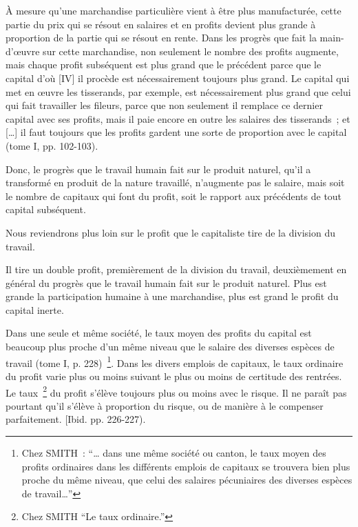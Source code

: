 \documentclass[french,twoside]{book} %
\newenvironment{quoteblock}%
  {\begin{quoting}}
  {\end{quoting}}
\newenvironment{quotebar}{%
    \def\FrameCommand{{\color{rubric!10!}\vrule width 0.5em} \hspace{0.9em}}%
    \def\OuterFrameSep{\itemsep} %
    \MakeFramed {\advance\hsize-\width \FrameRestore}
  }%
  {%
    \endMakeFramed
  }
\renewenvironment{quoteblock}%
  {%
    \savenotes
    \setstretch{0.9}
    \normalfont
    \begin{quotebar}
  }
  {%
    \end{quotebar}
    \spewnotes
  }
\begin{document}
\begin{quoteblock}
 À mesure qu’une marchandise particulière vient à être plus manufacturée, cette partie du prix qui se résout en salaires et en profits devient plus grande à proportion de la partie qui se résout en rente. Dans les progrès que fait la main-d’œuvre sur cette marchandise, non seulement le nombre des profits augmente, mais chaque profit subséquent est plus grand que le précédent parce que le capital d’où [IV] il procède est nécessairement toujours plus grand. Le capital qui met en œuvre les tisserands, par exemple, est nécessairement plus grand que celui qui fait travailler les fileurs, parce que non seulement il remplace ce dernier capital avec ses profits, mais il paie encore en outre les salaires des tisserands ; et […] il faut toujours que les profits gardent une sorte de proportion avec le capital (tome I, pp. 102-103).
 \end{quoteblock}

\noindent Donc, le progrès que le travail humain fait sur le produit naturel, qu’il a transformé en produit de la nature travaillé, n’augmente pas le salaire, mais soit le nombre de capitaux qui font du profit, soit le rapport aux précédents de tout capital subséquent.\par
Nous reviendrons plus loin sur le profit que le capitaliste tire de la division du travail.\par
Il tire un double profit, premièrement de la division du travail, deuxièmement en général du progrès que le travail humain fait sur le produit naturel. Plus est grande la participation humaine à une marchandise, plus est grand le profit du capital inerte.\par

\begin{quoteblock}
 \noindent Dans une seule et même société, le taux moyen des profits du capital est beaucoup plus proche d’un même niveau que le salaire des diverses espèces de travail (tome I, p. 228) \footnote{Chez SMITH : “… dans une même société ou canton, le taux moyen des profits ordinaires dans les différents emplois de capitaux se trouvera bien plus proche du même niveau, que celui des salaires pécuniaires des diverses espèces de travail…”}. Dans les divers emplois de capitaux, le taux ordinaire du profit varie plus ou moins suivant le plus ou moins de certitude des rentrées. Le taux \footnote{Chez SMITH “Le taux ordinaire.”} du profit s’élève toujours plus ou moins avec le risque. Il ne paraît pas pourtant qu’il s’élève à proportion du risque, ou de manière à le compenser parfaitement. [Ibid. pp. 226-227).
 \end{quoteblock}
\end{document}
